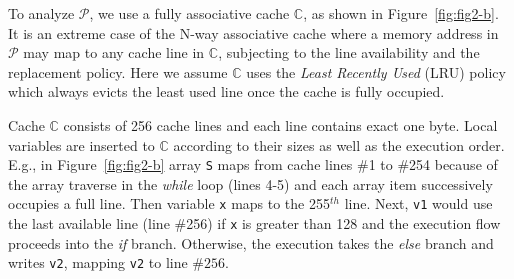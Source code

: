 \documentclass[sigconf]{acmart}
\newcommand{\prog}{\mathcal{P}}
\begin{document}
To analyze $\prog$, we use a fully associative cache $\mathbb{C}$, as shown in 
Figure~\ref{fig:fig2-b}. It is an extreme case of the N-way associative cache 
where a memory address in $\prog$ may map to any cache line in $\mathbb{C}$,
subjecting to the line availability and the replacement policy. Here we assume 
$\mathbb{C}$ uses the \emph{Least Recently Used} (LRU) policy which always
evicts the least used line once the cache is fully occupied.


Cache $\mathbb{C}$ consists of 256 cache lines and each line contains exact one byte. 
Local variables are inserted to $\mathbb{C}$ according to their sizes as well as 
the execution order. 
E.g., in Figure~\ref{fig:fig2-b} array \texttt{S} maps from 
cache lines \#1 to \#254 because of the array traverse in the \emph{while} loop 
(lines 4-5) and each array item successively occupies a full line. Then variable 
\texttt{x} maps to the 255$^{\mathit{th}}$ line. Next, \texttt{v1} would use the 
last available line (line \#256) if \texttt{x} is greater than 128 and the execution 
flow proceeds into the \textit{if} branch. Otherwise, the execution takes the 
\textit{else} branch and writes \texttt{v2}, mapping \texttt{v2} to line $\#256$.
\end{document}

